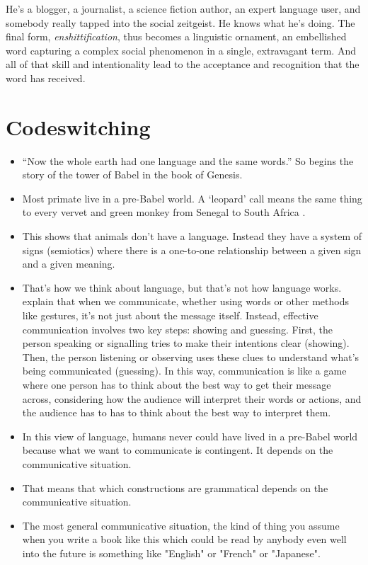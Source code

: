 He's a blogger, a journalist, a science fiction author, an expert language user, and somebody really tapped into the social zeitgeist. He knows what he's doing. The final form, \textit{enshittification}, thus becomes a linguistic ornament, an embellished word capturing a complex social phenomenon in a single, extravagant term. And all of that skill and intentionality lead to the acceptance and recognition that the word has received.


\section{Codeswitching}


\begin{itemize}
    \item ``Now the whole earth had one language and the same words.'' So begins the story of the tower of Babel in the book of Genesis. 
    \item Most primate live in a pre-Babel world. A `leopard' call means the same thing to every vervet and green monkey from Senegal to South Africa \citep{Price2014}.
    \item This shows that animals don't have a language. Instead they have a system of signs (semiotics) where there is a one-to-one relationship between a given sign and a given meaning.
    \item That's how we think about language, but that's not how language works. \citet{Smith2019a} explain that when we communicate, whether using words or other methods like gestures, it's not just about the message itself. Instead, effective communication involves two key steps: showing and guessing. First, the person speaking or signalling tries to make their intentions clear (showing). Then, the person listening or observing uses these clues to understand what's being communicated (guessing). In this way, communication is like a game where one person has to think about the best way to get their message across, considering how the audience will interpret their words or actions, and the audience has to has to think about the best way to interpret them.
    \item In this view of language, humans never could have lived in a pre-Babel world because what we want to communicate is contingent. It depends on the communicative situation.
    \item That means that which constructions are grammatical depends on the communicative situation.
    \item The most general communicative situation, the kind of thing you assume when you write a book like this which could be read by anybody even well into the future is something like "English" or "French" or "Japanese". 

\end{itemize}
